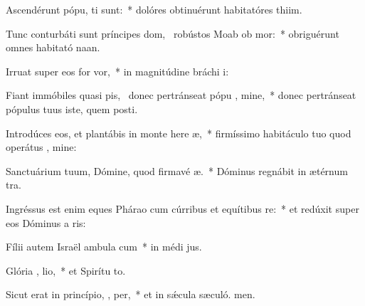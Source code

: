 \item Ascendérunt pópu,  ti sunt:~* dolóres obtinuérunt habitatóres thiim.
\item Tunc conturbáti sunt príncipes dom,~\pscross{} robústos Moab ob mor:~* obriguérunt omnes habitató naan.
\item Irruat super eos for  vor,~* in magnitúdine bráchi i:
\item Fiant immóbiles quasi pis,~\pscross{} donec pertránseat pópu , mine,~* donec pertránseat pópulus tuus iste, quem posti.
\item Introdúces eos, et plantábis in monte here æ,~* firmíssimo habitáculo tuo quod operátus , mine:
\item Sanctuárium tuum, Dómine, quod firmavé  æ.~* Dóminus regnábit in ætérnum  tra.
\item Ingréssus est enim eques Phárao cum cúrribus et equítibus   re:~* et redúxit super eos Dóminus a ris:
\item Fílii autem Israël ambula  cum~* in médi jus.
\item Glória ,  lio,~* et Spirítu to.
\item Sicut erat in princípio,  ,  per,~* et in sǽcula sæculó. men.
